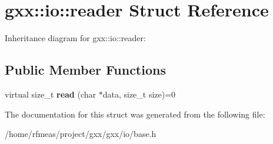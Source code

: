 \hypertarget{structgxx_1_1io_1_1reader}{}\section{gxx\+:\+:io\+:\+:reader Struct Reference}
\label{structgxx_1_1io_1_1reader}


Inheritance diagram for gxx\+:\+:io\+:\+:reader\+:
\subsection*{Public Member Functions}
\begin{DoxyCompactItemize}
\item 
virtual size\+\_\+t {\bfseries read} (char $\ast$data, size\+\_\+t size)=0\hypertarget{structgxx_1_1io_1_1reader_a71c152336f1d1c27675b069da57bd5dd}{}\label{structgxx_1_1io_1_1reader_a71c152336f1d1c27675b069da57bd5dd}

\end{DoxyCompactItemize}


The documentation for this struct was generated from the following file\+:\begin{DoxyCompactItemize}
\item 
/home/rfmeas/project/gxx/gxx/io/base.\+h\end{DoxyCompactItemize}
